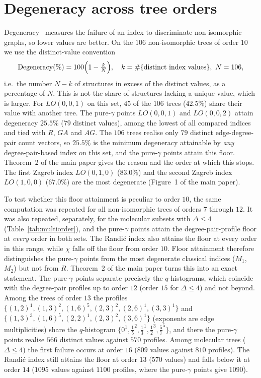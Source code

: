 \documentclass[a5paper, 10pt]{article}
\theoremstyle{plain}
\theoremstyle{remark}
\theoremstyle{definition}
\begin{document}
\section{Degeneracy across tree orders}\label{sec:s-degeneracy}

Degeneracy~\cite{Konstantinova1996Degeneracy} measures the failure of
an index to discriminate non-isomorphic graphs, so lower values are
better. On the $106$ non-isomorphic
trees of order $10$ we use the distinct-value convention
\[
\mathrm{Degeneracy}(\%) = 100\Bigl(1 - \tfrac{k}{N}\Bigr),
\quad k = \#\{\text{distinct index values}\},\ N = 106,
\]
i.e.\ the number $N - k$ of structures in excess of the distinct
values, as a percentage of $N$. This is not the share of structures
lacking a unique value, which is larger. For $LO(0,0,1)$ on this set,
$45$ of the $106$ trees ($42.5\%$) share their value with another
tree. The pure-$\gamma$ points $LO(0, 0, 1)$ and
$LO(0, 0, 2)$ attain degeneracy $25.5\%$ ($79$ distinct values),
among the lowest of all compared indices and tied with $R$, $GA$
and $AG$. The $106$ trees realise only $79$ distinct
edge-degree-pair count vectors, so $25.5\%$ is the minimum degeneracy
attainable by \emph{any} degree-pair-based index on this set, and the
pure-$\gamma$ points attain this floor. Theorem~2 of the main paper
gives the reason and the order at which this stops. The first
Zagreb index $LO(0, 1, 0)$ ($83.0\%$) and the second Zagreb index
$LO(1, 0, 0)$ ($67.0\%$) are the most degenerate
(Figure~1 of the main paper).

To test whether this floor attainment is peculiar to order $10$, the
same computation was repeated for all non-isomorphic trees of orders
$7$ through $12$. It was also repeated, separately, for the molecular
subsets with $\Delta \le 4$ (Table~\ref{tab:multiorder}), and the
pure-$\gamma$ points attain the degree-pair-profile floor at
\emph{every} order in both sets. The Randi\'c index also attains the
floor at every order in this range, while $\chi$ falls off the floor
from order $10$. Floor attainment therefore distinguishes the pure-$\gamma$ points from the most degenerate classical indices ($M_1$, $M_2$) but not from $R$.
Theorem~2 of the main paper turns this into an exact statement. The
pure-$\gamma$ points separate precisely the $q$-histograms, which
coincide with the degree-pair profiles up to order $12$ (order $15$ for
$\Delta \le 4$) and not beyond. Among the trees of order $13$ the
profiles
$\{(1,2)^{1}, (1,3)^{2}, (1,6)^{5}, (2,3)^{2}, (2,6)^{1}, (3,3)^{1}\}$
and $\{(1,3)^{3}, (1,6)^{5}, (2,2)^{1}, (2,3)^{2}, (3,6)^{1}\}$
(exponents are edge multiplicities) share the $q$-histogram
$\{0^{1}, \tfrac15^{2}, \tfrac13^{1}, \tfrac12^{3}, \tfrac57^{5}\}$,
and there the pure-$\gamma$ points realise $566$ distinct values against
$570$ profiles. Among molecular trees ($\Delta \le 4$) the first
failure occurs at order $16$ ($809$ values against $810$ profiles).
The Randi\'c index still attains the floor at order $13$ ($570$ values)
and falls below it at order $14$ ($1095$ values against $1100$
profiles, where the pure-$\gamma$ points give $1090$).
\end{document}
